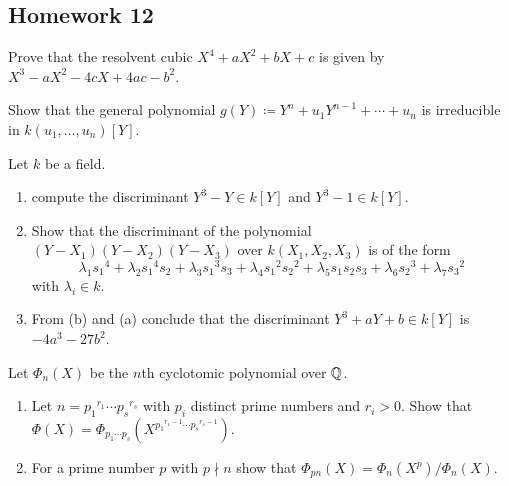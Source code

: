 \subsection{Homework 12}
\begin{problem}
  Prove that the resolvent cubic $X^4+aX^2+bX+c$ is given by
  $X^3-aX^2-4cX+4ac-b^2$.
\end{problem}
\begin{solution}
\end{solution}

\begin{problem}
  Show that the general polynomial $g(Y)\coloneq Y^n+u_1Y^{n-1}+\dotsb+u_n$
  is irreducible in $k(u_1,\dotsc,u_n)[Y]$.
\end{problem}
\begin{solution}
\end{solution}

\begin{problem}
  Let $k$ be a field.
  \begin{enumerate}[label=(\alph*),noitemsep]
  \item compute the discriminant $Y^3-Y\in k[Y]$ and $Y^3-1\in k[Y]$.
  \item Show that the discriminant of the polynomial
    $(Y-X_1)(Y-X_2)(Y-X_3)$ over $k(X_1,X_2,X_3)$ is of the form
    \[
      \lambda_1{s_1}^4+\lambda_2{s_1}^4s_2+\lambda_3{s_1}^3s_3+\lambda_4{s_1}^2{s_2}^2+\lambda_5s_1s_2s_3+\lambda_6{s_2}^3+\lambda_7{s_3}^2
    \]
    with $\lambda_i\in k$.
  \item From (b) and (a) conclude that the discriminant
    $Y^3+aY+b\in k[Y]$ is $-4a^3-27b^2$.
\end{enumerate}
\end{problem}
\begin{solution}
\end{solution}

\begin{problem}
  Let $\Phi_n(X)$ be the $n$th cyclotomic polynomial over $\mathbb{Q}$.
  \begin{enumerate}[label=(\alph*),noitemsep]
  \item Let $n={p_1}^{r_1}\dotsm{p_s}^{r_s}$ with $p_i$ distinct prime
    numbers and $r_i>0$. Show that
    $\Phi(X)=\Phi_{p_1\dotsm p_s}(X^{{p_1}^{r_1-1}\dotsm{p_s}^{r_s-1}})$.
  \item For a prime number $p$ with $p\nmid n$ show that
    $\Phi_{pn}(X)=\Phi_n(X^p)/\Phi_n(X)$.
  \end{enumerate}
\end{problem}
\begin{solution}
\end{solution}

